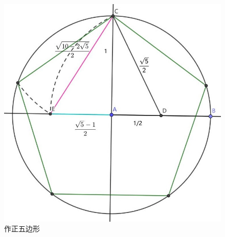 \documentclass[b5paper]{ctexart}
\begin{document}
\begin{figure}[htbp]
 \centering
 \includegraphics[scale=0.3]{img/pentagon-cons}
 \caption{作正五边形}
 \label{fig:pentagon-cons}
\end{figure}
\end{document}

